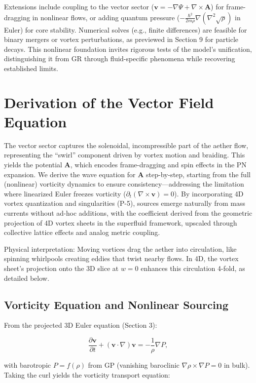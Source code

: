 \documentclass{article}
\begin{document}
Extensions include coupling to the vector sector ($\mathbf{v} = -\nabla \Psi + \nabla \times \mathbf{A}$) for frame-dragging in nonlinear flows, or adding quantum pressure ($-\frac{\hbar^2}{2m \rho} \nabla (\nabla^2 \sqrt{\rho})$ in Euler) for core stability. Numerical solves (e.g., finite differences) are feasible for binary mergers or vortex perturbations, as previewed in Section 9 for particle decays. This nonlinear foundation invites rigorous tests of the model's unification, distinguishing it from GR through fluid-specific phenomena while recovering established limits.

\section{Derivation of the Vector Field Equation}

The vector sector captures the solenoidal, incompressible part of the aether flow, representing the ``swirl'' component driven by vortex motion and braiding. This yields the potential $\mathbf{A}$, which encodes frame-dragging and spin effects in the PN expansion. We derive the wave equation for $\mathbf{A}$ step-by-step, starting from the full (nonlinear) vorticity dynamics to ensure consistency---addressing the limitation where linearized Euler freezes vorticity ($\partial_t (\nabla \times \mathbf{v}) = 0$). By incorporating 4D vortex quantization and singularities (P-5), sources emerge naturally from mass currents without ad-hoc additions, with the coefficient derived from the geometric projection of 4D vortex sheets in the superfluid framework, upscaled through collective lattice effects and analog metric coupling.

Physical interpretation: Moving vortices drag the aether into circulation, like spinning whirlpools creating eddies that twist nearby flows. In 4D, the vortex sheet's projection onto the 3D slice at $w=0$ enhances this circulation 4-fold, as detailed below.

\subsection{Vorticity Equation and Nonlinear Sourcing}

From the projected 3D Euler equation (Section 3):

\[
\frac{\partial \mathbf{v}}{\partial t} + (\mathbf{v} \cdot \nabla) \mathbf{v} = -\frac{1}{\rho} \nabla P,
\]

with barotropic $P = f(\rho)$ from GP (vanishing baroclinic $\nabla \rho \times \nabla P = 0$ in bulk). Taking the curl yields the vorticity transport equation:
\end{document}
